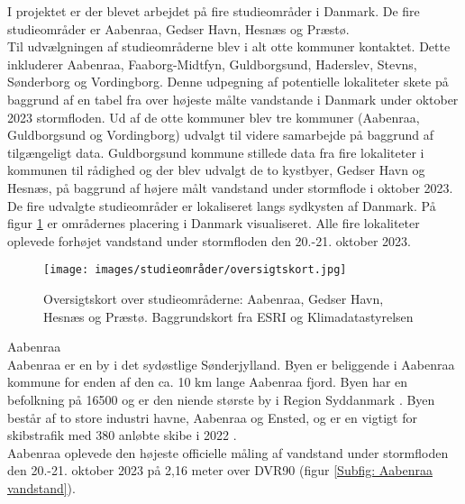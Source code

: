 
I projektet er der blevet arbejdet på fire studieområder i Danmark. De fire studieområder er Aabenraa, Gedser Havn, Hesnæs og Præstø.\\

Til udvælgningen af studieområderne blev i alt otte kommuner kontaktet. Dette inkluderer Aabenraa, Faaborg-Midtfyn, Guldborgsund, Haderslev, Stevns, Sønderborg og Vordingborg. Denne udpegning af potentielle lokaliteter skete på baggrund af en tabel fra \cite{damberg_vaerste_2023} over højeste målte vandstande i Danmark under oktober 2023 stormfloden. 
Ud af de otte kommuner blev tre kommuner (Aabenraa, Guldborgsund og Vordingborg) udvalgt til videre samarbejde på baggrund af tilgængeligt data. Guldborgsund kommune stillede data fra fire lokaliteter i kommunen til rådighed og der blev udvalgt de to kystbyer, Gedser Havn og Hesnæs, på baggrund af højere målt vandstand under stormflode i oktober 2023. \\

De fire udvalgte studieområder er lokaliseret langs sydkysten af Danmark. På figur \ref{Figur: Oversigtskort} er områdernes placering i Danmark visualiseret. Alle fire lokaliteter oplevede forhøjet vandstand under stormfloden den 20.-21. oktober 2023. 
\begin{figure}[H]
    \centering
    \texttt{[image: images/studieområder/oversigtskort.jpg]}
    \caption{Oversigtskort over studieområderne: Aabenraa, Gedser Havn, Hesnæs og Præstø. Baggrundskort fra ESRI og Klimadatastyrelsen}
    \label{Figur: Oversigtskort}
\end{figure}

{\large Aabenraa}\\
Aabenraa er en by i det sydøstlige Sønderjylland. Byen er beliggende i Aabenraa kommune for enden af den ca. 10 km lange Aabenraa fjord. Byen har en befolkning på 16500 og er den niende største by i Region Syddanmark \citep{danmarks_statistisk_mobile_nodate}. Byen består af to store industri havne, Aabenraa og Ensted, og er en vigtigt for skibstrafik med 380 anløbte skibe i 2022 \citep{aabenraa_havn_aabenraa-havn-talogfakta2022_2022}.\\
Aabenraa oplevede den højeste officielle måling af vandstand under stormfloden den 20.-21. oktober 2023 på 2,16 meter over DVR90 (figur \ref{Subfig: Aabenraa vandstand}). \\

